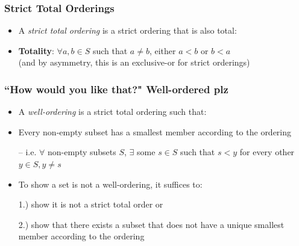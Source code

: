 \begin{frame}
\frametitle{Strict Total Orderings}

\begin{itemize}[<+->]

\item A \emph{strict total ordering} is a strict ordering that is also total:

\item \textbf{Totality}: $\forall a, b \in S$ such that $a \neq b$, either $a < b$ or $b < a$ \\ (and by asymmetry, this is an exclusive-or for strict orderings)

\end{itemize}
\end{frame}

\begin{frame}
\frametitle{``How would you like that?" Well-ordered plz}

\begin{itemize}[<+->]

\item A \emph{well-ordering} is a strict total ordering such that: 

\item Every non-empty subset has a smallest member according to the ordering

\item[] -- i.e. $\forall$ non-empty subsets $S$, $\exists$ some $s \in S$ such that $s < y$ for every other $y \in S, y \neq s$



\item To show a set is not a well-ordering, it suffices to:

\item[1.)] show it is not a strict total order or

\item[2.)] show that there exists a subset that does not have a unique smallest member according to the ordering


\end{itemize}
\end{frame}
